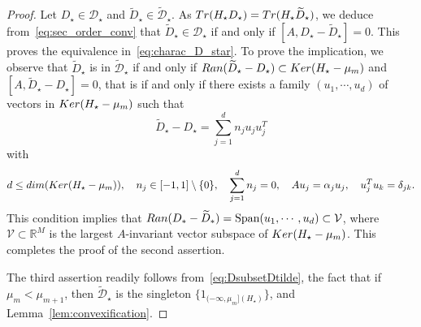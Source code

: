 \documentclass[10pt,a4paper]{amsart}
\def\R{\mathbb R}
\newcommand{\tr}{{\rm Tr}}
\begin{document}
\begin{proof}
\medskip

Let $D_\star \in \mathcal D_\star$ and $\widetilde D_\star \in \widetilde{\mathcal D}_\star$. As $\tr(H_\star D_\star) = \tr(H_\star \widetilde D_\star)$, we deduce from~\eqref{eq:sec_order_conv} that $\widetilde D_\star \in \mathcal D_\star$ if and only if $[A,D_\star-\widetilde D_\star]=0$. This proves the equivalence in~\eqref{eq:charac_D_star}. To prove the implication, we observe that $\widetilde D_\star$ is in $\widetilde{\mathcal D}_\star$ if and only if ${\rm Ran}(\widetilde D_\star-D_\star) \subset {\rm Ker}(H_\star-\mu_m)$ and $[A,\widetilde D_\star-D_\star]=0$, that is if and only if there exists a family $(u_1,\cdots,u_d)$ of vectors in ${\rm Ker}(H_\star-\mu_m)$ such that
$$
\widetilde D_\star-D_\star = \sum_{j=1}^{d} n_j u_ju_j^T 
$$
with
$$
d \le {\rm dim}({\rm Ker}(H_\star-\mu_m)), \quad n_j \in [-1,1] \setminus \{0\}, \quad \sum_{j=1}^d n_j=0, \quad Au_j= \alpha_j u_j, \quad u_j^Tu_k=\delta_{jk}.
$$
This condition implies that ${\rm Ran}(D_*-\widetilde D_*) = \mbox{Span}(u_1,\cdots,u_d) \subset \mathcal V$, where $\mathcal V \subset \R^M$ is the largest $A$-invariant vector subspace of ${\rm Ker}(H_\star-\mu_m)$. This completes the proof of the second assertion.

\medskip

The third assertion readily follows from~\eqref{eq:DsubsetDtilde}, the fact that if $\mu_m < \mu_{m+1}$, then $\widetilde {\mathcal D}_\star$ is the singleton $\{1_{(-\infty,\mu_m](H_\star)}\}$, and Lemma~\ref{lem:convexification}.
\end{proof}
\end{document}
